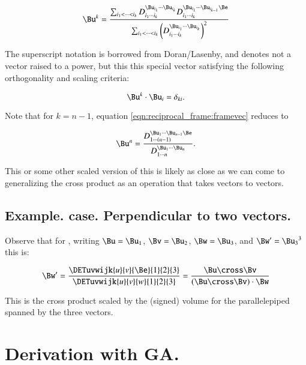\begin{equation} \label{eqn:reciprocal_frame:framevec}
\Bu^k =
\frac{
\sum_{i_1 < \cdots < i_{k} } 
D_{i_1 \cdots i_{k}}^{\Bu_{i_1} \cdots \Bu_{i_{k}}}
D_{i_1 \cdots i_{k}}^{\Bu_{i_1} \cdots \Bu_{i_{k-1}} \Be }}
{
\sum_{i_1 < \cdots < i_{k} } \left(D_{i_1 \cdots i_{k}}^{\Bu_{i_1} \cdots \Bu_{i_{k}}}\right)^2
}
\end{equation}

The superscript notation is borrowed from Doran/Lasenby, and denotes not a vector raised to a power, but this
this special vector satisfying the following orthogonality and scaling criteria:

\begin{equation}\label{eqn:reciprocal_frame:reciportho}
\Bu^k \cdot \Bu_i = \delta_{ki}.
\end{equation}

Note that for $k=n-1$, equation \ref{eqn:reciprocal_frame:framevec} reduces to

\begin{equation} \label{eqn:reciprocal_frame:framevecnminus}
\Bu^n =
\frac{ D_{1 \cdots (n-1)}^{\Bu_1 \cdots \Bu_{n-1} \Be} } { D_{1 \cdots n}^{\Bu_1 \cdots \Bu_n} }.
\end{equation}

This or some other scaled version of this is likely as close as we can come to generalizing the cross product
as an operation that takes vectors to vectors.

\subsection{Example.   case.  Perpendicular to two vectors. }

Observe that for , writing $\Bu = \Bu_1$, $\Bv = \Bu_2$, $\Bw = \Bu_3$, and $\Bw' = {\Bu_3}^3$ this is:

\begin{equation}
\Bw' = 
\frac{\DETuvwijk{u}{v}{\Be}{1}{2}{3}}{\DETuvwijk{u}{v}{w}{1}{2}{3}}
= 
\frac{\Bu \cross \Bv}{(\Bu \cross \Bv) \cdot \Bw}
\end{equation}

This is the cross product scaled by the (signed) volume for the parallelepiped spanned by the three vectors.

\section{Derivation with GA. }

